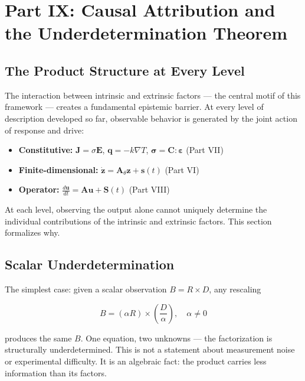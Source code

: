 \documentclass[
  letterpaper,
  DIV=11,
  numbers=noendperiod]{scrartcl}
\providecommand{\tightlist}{%
  \setlength{\itemsep}{0pt}\setlength{\parskip}{0pt}}
\begin{document}
\section{Part IX: Causal Attribution and the Underdetermination
Theorem}\label{part-ix-causal-attribution-and-the-underdetermination-theorem}

\subsection{The Product Structure at Every
Level}\label{the-product-structure-at-every-level}

The interaction between intrinsic and extrinsic factors --- the central
motif of this framework --- creates a fundamental epistemic barrier. At
every level of description developed so far, observable behavior is
generated by the joint action of response and drive:

\begin{itemize}
\tightlist
\item
  \textbf{Constitutive:} \(\mathbf{J} = \sigma \mathbf{E}\),
  \(\mathbf{q} = -k\nabla T\),
  \(\boldsymbol{\sigma} = \mathbf{C}:\boldsymbol{\varepsilon}\) (Part
  VII)
\item
  \textbf{Finite-dimensional:}
  \(\dot{\mathbf{z}} = \mathbf{A}_\theta \mathbf{z} + \mathbf{s}(t)\)
  (Part VI)
\item
  \textbf{Operator:}
  \(\frac{d\mathbf{u}}{dt} = \mathbf{A}\mathbf{u} + \mathbf{S}(t)\)
  (Part VIII)
\end{itemize}

At each level, observing the output alone cannot uniquely determine the
individual contributions of the intrinsic and extrinsic factors. This
section formalizes why.

\subsection{Scalar Underdetermination}\label{scalar-underdetermination}

The simplest case: given a scalar observation \(B = R \times D\), any
rescaling

\[B = (\alpha R) \times \left(\frac{D}{\alpha}\right), \quad \alpha \neq 0\]

produces the same \(B\). One equation, two unknowns --- the
factorization is structurally underdetermined. This is not a statement
about measurement noise or experimental difficulty. It is an algebraic
fact: the product carries less information than its factors.
\end{document}
